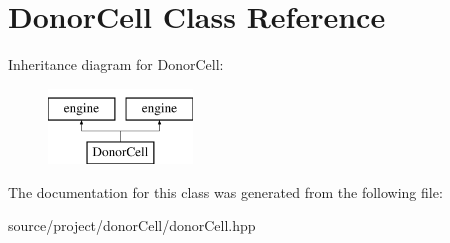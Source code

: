 \hypertarget{classDonorCell}{}\section{Donor\+Cell Class Reference}
\label{classDonorCell}
Inheritance diagram for Donor\+Cell\+:\begin{figure}[H]
\begin{center}
\leavevmode
\includegraphics[height=2.000000cm]{classDonorCell}
\end{center}
\end{figure}


The documentation for this class was generated from the following file\+:\begin{DoxyCompactItemize}
\item 
source/project/donor\+Cell/donor\+Cell.\+hpp\end{DoxyCompactItemize}
